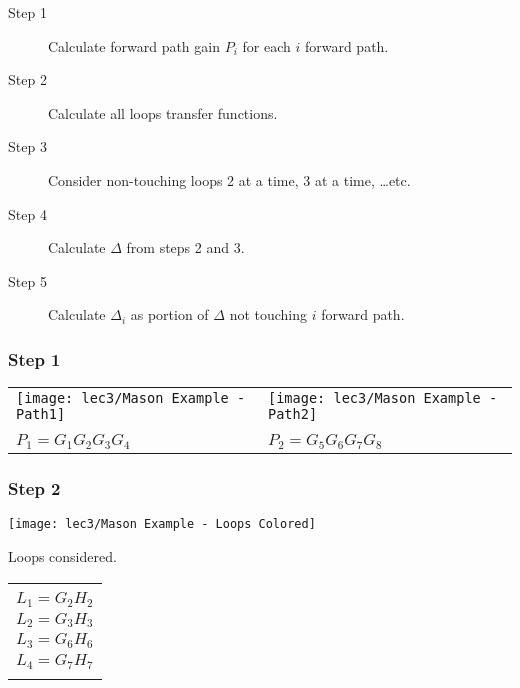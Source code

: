 \begin{description}
	\item[Step 1]  Calculate forward path gain $P_i$ for each $i$ forward path.
	\item[Step 2]  Calculate all loops transfer functions.
	\item[Step 3]  Consider non-touching loops 2 at a time, 3 at a time, \ldots etc.
	\item[Step 4]  Calculate $\Delta$ from steps 2 and 3.
	\item[Step 5]  Calculate $\Delta_i$ as portion of $\Delta$ not touching $i$ forward path.
\end{description}

\subsubsection{Step 1}
\begin{tabular}{>{\small\centering\arraybackslash}m{5.35cm}>{\small\centering\arraybackslash}m{5.35cm}}
	\texttt{[image: lec3/Mason Example - Path1]} & \texttt{[image: lec3/Mason Example - Path2]}\\
	&\\[-2mm]
	$P_1 = G_1G_2G_3G_4$ & $P_2 = G_5G_6G_7G_8$ \\
\end{tabular}


\subsubsection{Step 2}

\begin{marginfigure}
		\texttt{[image: lec3/Mason Example - Loops Colored]}
		\caption{Loops considered.}
\end{marginfigure}

\hspace{1.05cm}
\begin{tabular}{| c |}
			\hline
	        \multicolumn{1}{c}{}\\[-1em]
	        $L_1=G_2H_2$ \\
	        $L_2=G_3H_3$ \\
	        $L_3=G_6H_6$ \\
	        $L_4=G_7H_7$ \\
	        \multicolumn{1}{c}{}\\[-1em]
	        \hline
\end{tabular}


